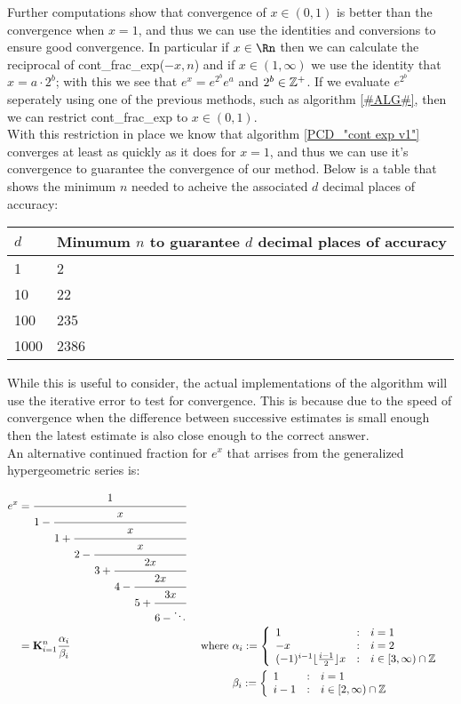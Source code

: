 Further computations show that convergence of \(x \in (0, 1)\) is better than the convergence when \(x=1\), and thus we can use the identities and conversions to ensure good convergence. In particular if \(x \in \Rn\) then we can calculate the reciprocal of \textrm{cont\_frac\_exp(\(-x, n\))} and if \(x \in (1,\infty)\) we use the identity that \(x = a\cdot2^b\); with this we see that \(e^x = e^{2^b}e^a\) and \(2^b \in \mathbb{Z}^+\). If we evaluate \(e^{2^b}\) seperately using one of the previous methods, such as algorithm \ref{#ALG#}, then we can restrict \textrm{cont\_frac\_exp} to \(x \in (0,1)\).\\

With this restriction in place we know that algorithm \ref{PCD_"cont exp v1"} converges at least as quickly as it does for \(x = 1\), and thus we can use it's convergence to guarantee the convergence of our method. Below is a table that shows the minimum \(n\) needed to acheive the associated \(d\) decimal places of accuracy:

\begin{center}
\begin{tabular}{|l|l|}
\hline
\(d\) & Minumum \(n\) to guarantee \(d\) decimal places of accuracy\\\hline
1 & 2 \\\hline
10 & 22 \\\hline
100 & 235 \\\hline
1000 & 2386 \\\hline
\end{tabular}
\end{center}

While this is useful to consider, the actual implementations of the algorithm will use the iterative error to test for convergence. This is because due to the speed of convergence when the difference between successive estimates is small enough then the latest estimate is also close enough to the correct answer.\\

An alternative continued fraction for \(e^x\) that arrises from the generalized hypergeometric series is:

\begin{align}
e^x &= \cfrac{1}{1 -
	   \cfrac{x}{1 +
	   \cfrac{x}{2 -
	   \cfrac{x}{3 +
	   \cfrac{2x}{4 -
	   \cfrac{2x}{5 +
	   \cfrac{3x}{6 - \ddots} } } } } } } \label{EQN_"exp cont frac 2"}\\
	&= \mathbf{K}_{i=1}^n\frac{\alpha_i}{\beta_i} &\textrm{ where } 
		&\alpha_i := \left\{\begin{array}{lcl}
			1 &:& i = 1\\
			-x &:& i = 2\\
			(-1)^{i-1}\lfloor\frac{i-1}{2}\rfloor x&:&i\in[3,\infty)\cap\mathbb{Z}
			\end{array}\right.\nonumber\\
	&  &&\beta_i := \left\{\begin{array}{lcl}
			1 &:& i=1\\
			i-1 &:& i \in [2, \infty) \cap\mathbb{Z}
			\end{array}\right.\nonumber
\end{align}

